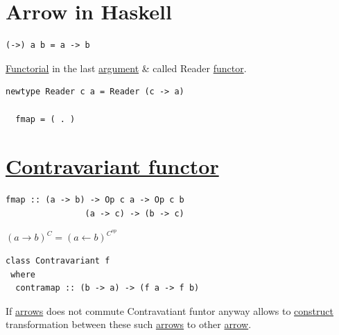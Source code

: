 \documentclass[a4paper,14pt,oneside]{book}
\begin{document}
\chapter{\label{org7a1bcca}Arrow in Haskell}
\label{sec:orgc04a463}

\begin{verbatim}
(->) a b = a -> b
\end{verbatim}
\hyperref[orgba93497]{Functorial} in the last \hyperref[org98012e7]{argument} \& called Reader \hyperref[org757e79a]{functor}.

\begin{verbatim}
newtype Reader c a = Reader (c -> a)

  fmap = ( . )
\end{verbatim}

\chapter{\hyperref[org7a0d2b4]{Contravariant functor}}
\label{sec:org14ea759}

\begin{verbatim}
fmap :: (a -> b) -> Op c a -> Op c b
                (a -> c) -> (b -> c)
\end{verbatim}


\((a \to b)^{C} = (a \leftarrow b)^{C^{op}}\)

\begin{verbatim}
class Contravariant f
 where
  contramap :: (b -> a) -> (f a -> f b)
\end{verbatim}


If \hyperref[org100022b]{arrows} does not commute Contravatiant funtor anyway allows to \hyperref[org3afc1f7]{construct} transformation between these such \hyperref[org100022b]{arrows} to other \hyperref[org55b33e1]{arrow}.
\end{document}
